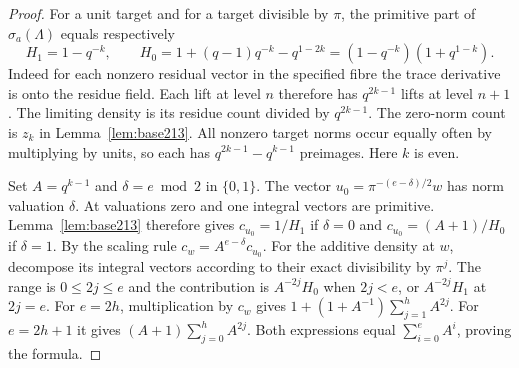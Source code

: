 \documentclass[a4paper,11pt]{article}
\theoremstyle{definition}
\theoremstyle{remark}
\numberwithin{equation}{section}
\begin{document}
\begin{proof}
For a unit target and for a target divisible by \(\pi\), the
primitive part of \(\sigma_a(\Lambda)\) equals respectively
\[
 H_1=1-q^{-k},\qquad
 H_0=1+(q-1)q^{-k}-q^{1-2k}
                  =(1-q^{-k})(1+q^{1-k}).
\]
Indeed for each nonzero residual vector in the specified fibre
the trace derivative is onto the residue field. Each lift at
level \(n\) therefore has \(q^{2k-1}\) lifts at level \(n+1\).
The limiting density is its residue count divided by \(q^{2k-1}\).
The zero-norm count is \(z_k\) in Lemma~\ref{lem:base213}. All
nonzero target norms occur equally often by multiplying by units,
so each has \(q^{2k-1}-q^{k-1}\) preimages. Here \(k\) is even.

Set \(A=q^{k-1}\) and \(\delta=e\bmod2\) in \(\{0,1\}\). The
vector \(u_0=\pi^{-(e-\delta)/2}w\) has norm valuation \(\delta\).
At valuations zero and one integral vectors are primitive.
Lemma~\ref{lem:base213} therefore gives \(c_{u_0}=1/H_1\)
if \(\delta=0\) and \(c_{u_0}=(A+1)/H_0\) if \(\delta=1\).
By the scaling rule \(c_w=A^{e-\delta}c_{u_0}\).
For the additive density at \(w\), decompose its integral
vectors according to their exact divisibility by \(\pi^j\).
The range is \(0\le2j\le e\) and the contribution is
\(A^{-2j}H_0\) when \(2j<e\), or \(A^{-2j}H_1\) at \(2j=e\).
For \(e=2h\), multiplication by \(c_w\) gives
\(1+(1+A^{-1})\sum_{j=1}^h A^{2j}\).
For \(e=2h+1\) it gives \((A+1)\sum_{j=0}^h A^{2j}\).
Both expressions equal \(\sum_{i=0}^e A^i\), proving the formula.
\end{proof}
\end{document}
